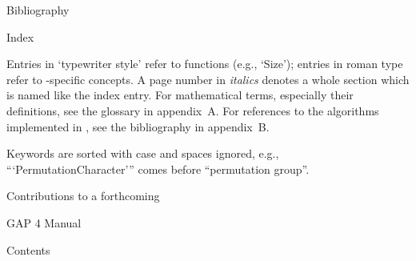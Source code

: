 

\FrontMatter
%
%

\Chapters
%

\Appendices


\Chapter Bibliography

\Bibliography

\Chapter Index

Entries in     `typewriter style' refer  to   {\GAP}  functions (e.g.,
`Size'); entries in roman type   refer to {\GAP}-specific concepts.  A
page number in  {\it italics} denotes a  whole section which is  named
like the   index  entry.  For  mathematical terms,    especially their
definitions, see   the glossary in  appendix~A. For  references to the
algorithms implemented in {\GAP}, see the bibliography in appendix~B.

Keywords   are   sorted  with    case  and   spaces    ignored,  e.g.,
```PermutationCharacter''' comes before ``permutation group''.

\Index

\null\vfill
\centerline{\titlefont Contributions to a forthcoming}
\centerline{\titlefont GAP 4 Manual}

\Chapter Contents
  
\TableOfContents

\bye
